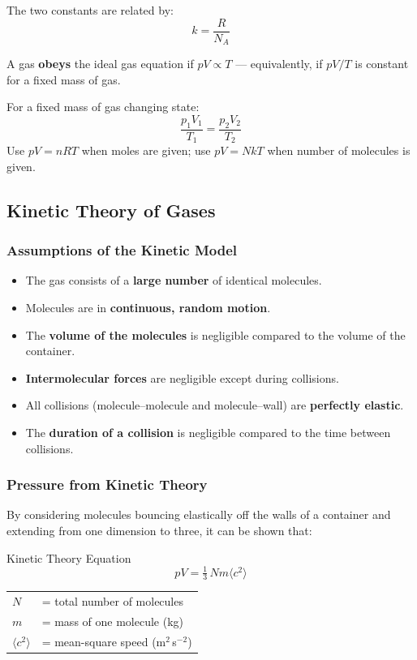 The two constants are related by:
\begin{equation}
  k = \frac{R}{N_A}
\end{equation}

A gas \textbf{obeys} the ideal gas equation if $pV \propto T$ — equivalently, if
$pV/T$ is constant for a fixed mass of gas.

\begin{tipbox}
For a fixed mass of gas changing state:
\[
  \frac{p_1 V_1}{T_1} = \frac{p_2 V_2}{T_2}
\]
Use $pV = nRT$ when moles are given; use $pV = NkT$ when number of molecules is given.
\end{tipbox}

\subsection{Kinetic Theory of Gases}

\subsubsection{Assumptions of the Kinetic Model}

\begin{itemize}
  \item The gas consists of a \textbf{large number} of identical molecules.
  \item Molecules are in \textbf{continuous, random motion}.
  \item The \textbf{volume of the molecules} is negligible compared to the volume of
        the container.
  \item \textbf{Intermolecular forces} are negligible except during collisions.
  \item All collisions (molecule–molecule and molecule–wall) are \textbf{perfectly
        elastic}.
  \item The \textbf{duration of a collision} is negligible compared to the time
        between collisions.
\end{itemize}

\subsubsection{Pressure from Kinetic Theory}

By considering molecules bouncing elastically off the walls of a container and
extending from one dimension to three, it can be shown that:

\begin{formulabox}{Kinetic Theory Equation}
\begin{equation}
  pV = \tfrac{1}{3}\,Nm\langle c^2 \rangle
\end{equation}
\begin{tabular}{ll}
$N$                     & = total number of molecules \\
$m$                     & = mass of one molecule (kg) \\
$\langle c^2 \rangle$   & = mean-square speed (m$^2$\,s$^{-2}$) \\
\end{tabular}
\end{formulabox}

